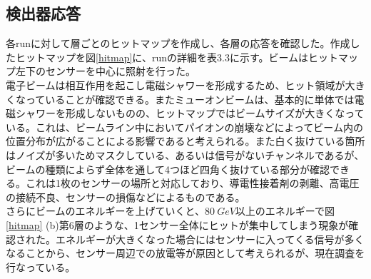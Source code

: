\subsection{検出器応答}
各runに対して層ごとのヒットマップを作成し、各層の応答を確認した。作成したヒットマップを図\ref{hitmap}に、runの詳細を表3.3に示す。ビームはヒットマップ左下のセンサーを中心に照射を行った。\\
電子ビームは相互作用を起こし電磁シャワーを形成するため、ヒット領域が大きくなっていることが確認できる。またミューオンビームは、基本的に単体では電磁シャワーを形成しないものの、ヒットマップではビームサイズが大きくなっている。これは、ビームライン中においてパイオンの崩壊などによってビーム内の位置分布が広がることによる影響であると考えられる。また白く抜けている箇所はノイズが多いためマスクしている、あるいは信号がないチャンネルであるが、ビームの種類によらず全体を通して4つほど四角く抜けている部分が確認できる。これは1枚のセンサーの場所と対応しており、導電性接着剤の剥離、高電圧の接続不良、センサーの損傷などによるものである。\\
さらにビームのエネルギーを上げていくと、$\SI{80}{GeV}$以上のエネルギーで図\ref{hitmap} (b)第6層のような、1センサー全体にヒットが集中してしまう現象が確認された。エネルギーが大きくなった場合にはセンサーに入ってくる信号が多くなることから、センサー周辺での放電等が原因として考えられるが、現在調査を行なっている。
